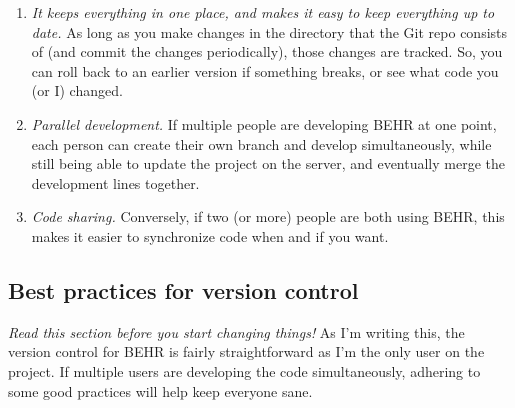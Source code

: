 \documentclass[12pt]{article}
\begin{document}
	\begin{enumerate}
	 \item \emph{It keeps everything in one place, and makes it easy to keep everything up to date.} As long as you make changes in the directory that the Git repo consists of (and commit the changes periodically), those changes are tracked.  So, you can roll back to an earlier version if something breaks, or see what code you (or I) changed.
	 \item \emph{Parallel development.}  If multiple people are developing BEHR at one point, each person can create their own branch and develop simultaneously, while still being able to update the project on the server, and eventually merge the development lines together.
	 \item \emph{Code sharing.} Conversely, if two (or more) people are both using BEHR, this makes it easier to synchronize code when and if you want.
	\end{enumerate}
	
	\subsection{Best practices for version control}
	\emph{Read this section before you start changing things!} As I'm writing this, the version control for BEHR is fairly straightforward as I'm the only user on the project. If multiple users are developing the code simultaneously, adhering to some good practices will help keep everyone sane.
	
\end{document}

